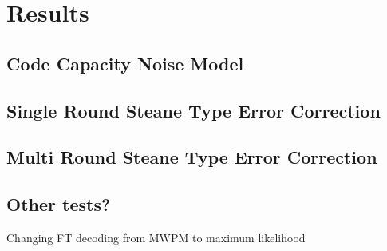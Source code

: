 \chapter{Results}

\section{Code Capacity Noise Model}


\section{Single Round Steane Type Error Correction}


\section{Multi Round Steane Type Error Correction}

\section{Other tests?}
Changing FT decoding from MWPM to maximum likelihood